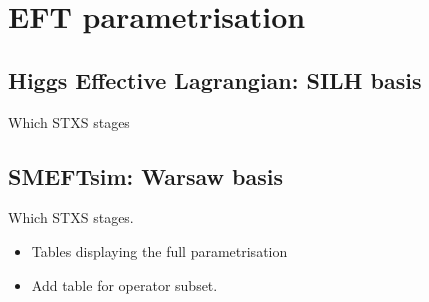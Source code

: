 \chapter{EFT parametrisation}\label{app:hel_parametrisation}

\section{Higgs Effective Lagrangian: SILH basis}
Which STXS stages


\section{SMEFTsim: Warsaw basis}
Which STXS stages.

\begin{itemize}
    \item Tables displaying the full parametrisation
    \item Add table for operator subset.
\end{itemize}